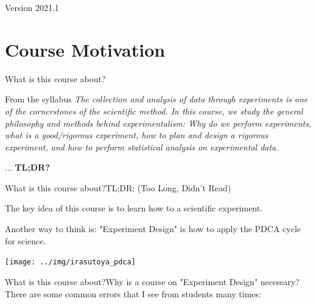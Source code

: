 \documentclass{beamer}
\subtitle[Intro]{Topic 00 - Course Introduction}
\begin{document}
\begin{CJK}{UTF8}{ipxm}


\begin{frame}
  \maketitle

  \vfill

  \hfill Version 2021.1
\end{frame}

\section{Course Motivation}
\begin{frame}{What is this course about?}

  \begin{block}{From the syllabus}
  \emph{The collection and analysis of data through experiments is one of the cornerstones of the scientific method. In this course, we study the general philosophy and methods behind experimentalism: Why do we perform experiments, what is a good/rigorous experiment, how to plan and design a rigorous experiment, and how to perform statistical analysis on experimental data.}
  \end{block}
  \bigskip

  ... {\bf TL;DR?}
\end{frame}

\begin{frame}{What is this course about?}{TL;DR; (Too Long, Didn't Read)}

  The key idea of this course is to learn how to  a scientific experiment.\bigskip

  Another way to think is: "Experiment Design" is how to apply the PDCA cycle for science.
  \begin{center}
    \texttt{[image: ../img/irasutoya\_pdca]}
  \end{center}
\end{frame}

\begin{frame}{What is this course about?}{Why is a course on "Experiment Design" necessary?}
  There are some common errors that I see from students many times:
  \bigskip


\end{frame}
\end{CJK}
\end{document}
